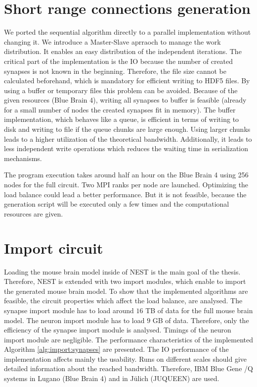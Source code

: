 \section{Short range connections generation}
We ported the sequential algorithm directly to a parallel implementation without changing it.
We introduce a Master-Slave aprraoch to manage the work distribution.
It enables an easy distribution of the independent iterations.
The critical part of the implementation is the IO because the number of created synapses is not known in the beginning.
Therefore, the file size cannot be calculated beforehand, which is mandatory for efficient writing to HDF5 files. 
By using a buffer or temporary files this problem can be avoided.
Because of the given resources (Blue Brain 4),
writing all synapses to buffer is feasible (already for a small number of nodes the created synapses fit in memory).
The buffer implementation, which behaves like a queue, is efficient in terms of writing to disk and writing to file
if the queue chunks are large enough. Using larger chunks leads to 
a higher utilization of the theoretical bandwidth. Additionally, it leads to less independent
write operations which reduces the waiting time in serialization mechanisms.

The program execution takes around half an hour on the Blue Brain 4 using 256 nodes for the full circuit.
Two MPI ranks per node are launched. Optimizing the load balance could lead a better performance.
But it is not feasible, because the generation script will be executed only a few times
and the computational resources are given.

\section{Import circuit}
Loading the mouse brain model inside of NEST is the main goal of the thesis.
Therefore, NEST is extended with two import modules, which enable to import the
generated mouse brain model. To show that the implemented algorithms are feasible, 
the circuit properties which affect the load balance, are analysed.
The synapse import module has to load around $16$ TB of data for the full mouse brain model.
The neuron import module has to load $9$ GB of data.
Therefore, only the efficiency of the synapse import module is analysed.
Timings of the neuron import module are negligible.
The performance characteristics of the implemented Algorithm \ref{alg:import:synapses} are presented.
The IO performance of the implementation affects mainly the usability.
Runs on different scales should give detailed information about the reached bandwidth.
Therefore, IBM Blue Gene /Q systems in Lugano (Blue Brain 4) and in J\"{u}lich (JUQUEEN) are used.

